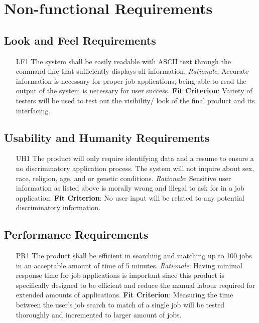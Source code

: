 \documentclass[12pt, titlepage]{article}
\makeatletter
\def\itemlabel#1#2{\def\@currentlabel{#2}\phantomsection\label{#1}}
\makeatother
\begin{document}
\section{Non-functional Requirements}

\subsection{Look and Feel Requirements}
\begin{itemize}
    \item [LF1] The system shall be easily readable with ASCII text through the command line that sufficiently displays all information.
    {\newline \emph{Rationale}: Accurate information is necessary for proper job applications, being able to read the output of the system is necessary for user success.
	\newline \textbf{Fit Criterion}: Variety of testers will be used to test out the visibility/ look of the final product and its interfacing.}
\end{itemize}

\subsection{Usability and Humanity Requirements}
\begin{itemize}
    \item [UH1] \itemlabel{item:UH1}{UH1} The product will only require identifying data and a resume to ensure a no discriminatory application process. The system will not inquire about sex, race, religion, age, and or genetic conditions.
    {\newline \emph{Rationale}: Sensitive user information as listed above is morally wrong and illegal to ask for in a job application.
	\newline \textbf{Fit Criterion}: No user input will be related to any potential discriminatory information.}
\end{itemize}

\subsection{Performance Requirements}
\begin{itemize}
    \item [PR1] The product shall be efficient in searching and matching up to 100 jobs in an acceptable amount of time of 5 minutes. 
    {\newline \emph{Rationale}: Having minimal response time for job applications is important since this product is specifically designed to be efficient and reduce the manual labour required for extended amounts of applications.
	\newline \textbf{Fit Criterion}: Measuring the time between the user's job search to match of a single job will be tested thoroughly and incremented to larger amount of jobs.}
	
\end{itemize}
\end{document}

